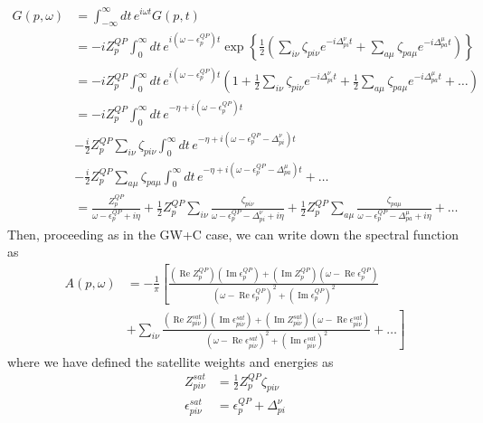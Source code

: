 \begin{align}
G(p, \omega) &= \int_{-\infty}^{\infty} dt\, e^{i \omega t} G(p,t) \\
&= -i Z_p^{QP} \int_0^{\infty} dt\, e^{i (\omega - \epsilon_p^{QP}) t} \exp \left\{ \frac{1}{2}\left(\sum_{i\nu} \zeta_{pi\nu} e^{-i \Delta_{pi}^\nu t} + \sum_{a\mu} \zeta_{pa\mu} e^{-i \Delta_{pa}^\mu t} \right) \right\} \\
&= -i Z_p^{QP} \int_0^{\infty} dt\, e^{i (\omega - \epsilon_p^{QP}) t} \left( 1 + \frac{1}{2}\sum_{i\nu} \zeta_{pi\nu} e^{-i \Delta_{pi}^\nu t} + \frac{1}{2}\sum_{a\mu} \zeta_{pa\mu} e^{-i \Delta_{pa}^\mu t} + \ldots \right) \\
&= -i Z_p^{QP} \int_0^{\infty} dt\, e^{-\eta + i (\omega - \epsilon_p^{QP}) t}\\
& - \frac{i}{2}Z_p^{QP}\sum_{i\nu} \zeta_{pi\nu} \int_0^{\infty} dt\, e^{-\eta + i (\omega - \epsilon_p^{QP} - \Delta_{pi}^\nu) t}\\
& - \frac{i}{2}Z_p^{QP}\sum_{a\mu} \zeta_{pa\mu} \int_0^{\infty} dt\, e^{-\eta + i (\omega - \epsilon_p^{QP} - \Delta_{pa}^\mu) t} + \ldots \\
&= \frac{Z_p^{QP}}{\omega - \epsilon_p^{QP} + i \eta} + \frac{1}{2} Z_p^{QP} \sum_{i\nu} \frac{\zeta_{pi\nu}}{\omega - \epsilon_p^{QP} - \Delta_{pi}^\nu + i \eta} + \frac{1}{2} Z_p^{QP} \sum_{a\mu} \frac{\zeta_{pa\mu}}{\omega - \epsilon_p^{QP} - \Delta_{pa}^\mu + i \eta} + \ldots
\end{align}
Then, proceeding as in the GW+C case, we can write down the spectral function as
\begin{align}
A(p, \omega) 
& = -\frac{1}{\pi}\left[\frac{\left(\operatorname{Re} Z_p^{QP}\right)\left(\operatorname{Im} \epsilon_p^{QP}\right) + \left(\operatorname{Im} Z_p^{QP}\right)\left(\omega - \operatorname{Re} \epsilon_p^{QP}\right)}{\left(\omega - \operatorname{Re} \epsilon_p^{QP}\right)^2 + \left(\operatorname{Im} \epsilon_p^{QP}\right)^2}\right.\\
& \left. + \sum_{i\nu} \frac{\left(\operatorname{Re} Z_{pi\nu}^{sat}\right)\left(\operatorname{Im} \epsilon_{pi\nu}^{sat}\right) + \left(\operatorname{Im} Z_{pi\nu}^{sat}\right)\left(\omega - \operatorname{Re} \epsilon_{pi\nu}^{sat}\right)}{\left(\omega - \operatorname{Re} \epsilon_{pi\nu}^{sat}\right)^2 + \left(\operatorname{Im} \epsilon_{pi\nu}^{sat}\right)^2} + \ldots \right]
\end{align}
where we have defined the satellite weights and energies as
\begin{align}
Z_{pi\nu}^{sat} & = \frac{1}{2} Z_p^{QP} \zeta_{pi\nu} \\
\epsilon_{pi\nu}^{sat} & = \epsilon_p^{QP} + \Delta_{pi}^\nu
\end{align}
